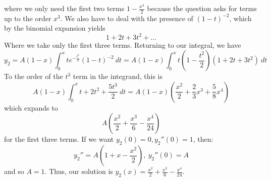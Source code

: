 \documentclass{article}
\begin{document}
where we only need the first two terms $1-\frac{x^2}{2}$ because the question asks for terms up to the order $x^3$. We also have to deal with the presence of $(1-t)^{-2}$, which by the binomial expansion yields
\begin{equation*}
    1+2t+3t^2+\dots
\end{equation*}
Where we take only the first three terms. Returning to our integral, we have
\begin{equation*}
    y_2=A(1-x)\int^{x}_{0} te^{-\frac{t^2}{2}}(1-t)^{-2}\ dt = A(1-x)\int^{x}_{0} t(1-\frac{t^2}{2})(1+2t+3t^2) \ dt
\end{equation*}
To the order of the $t^3$ term in the integrand, this is
\begin{equation*}
    A(1-x)\int_{0}^{x}t + 2t^2 + \frac{5t^3}{2} \ dt = A(1-x)(\frac{x^2}{2}+\frac{2}{3}x^3+\frac{5}{8}x^4)
\end{equation*}
which expands to
\begin{equation*}
    A(\frac{x^2}{2} + \frac{x^3}{6} -\frac{x^4}{24})
\end{equation*}
for the first three terms. If we want $y_2(0) = 0, y_2''(0) = 1$, then:
\begin{equation*}
    y_2'' = A(1+x-\frac{x^2}{2}),\ y_2''(0) = A
\end{equation*}
and so $A=1$. Thus, our solution is $y_2(x) = \frac{x^2}{2} +\frac{x^3}{6}-\frac{x^4}{24}$.
 
\hrulefill
\end{document}

